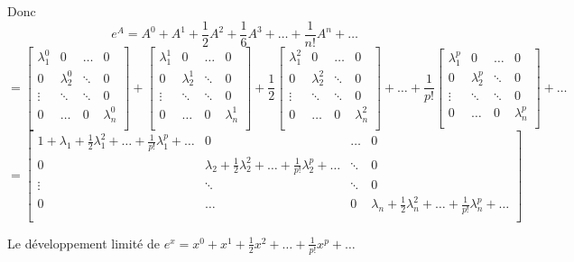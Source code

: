 \documentclass[]{book}
\theoremstyle{definition}
\begin{document}
Donc 
$$
e^A = A^0 + A^1 + \frac{1}{2}A^2 + \frac{1}{6}A^3 + \ldots + \frac{1}{n!}A^n + \ldots
$$
$$= 
\begin{bmatrix}
    \lambda_1^0 & 0 & \ldots & 0 \\    
    0 & \lambda_2^0  & \ddots & 0 \\
    \vdots & \ddots & \ddots & 0 \\    
    0 & \ldots & 0 & \lambda_n^0\\
\end{bmatrix}
+
\begin{bmatrix}
    \lambda_1^1 & 0 & \ldots & 0 \\    
    0 & \lambda_2^1  & \ddots & 0 \\
    \vdots & \ddots & \ddots & 0 \\    
    0 & \ldots & 0 & \lambda_n^1\\
\end{bmatrix}
+
\frac{1}{2}
\begin{bmatrix}
    \lambda_1^2 & 0 & \ldots & 0 \\    
    0 & \lambda_2^2  & \ddots & 0 \\
    \vdots & \ddots & \ddots & 0 \\    
    0 & \ldots & 0 & \lambda_n^2\\
\end{bmatrix}
+
\ldots
+
\frac{1}{p!}
\begin{bmatrix}
    \lambda_1^p & 0 & \ldots & 0 \\    
    0 & \lambda_2^p  & \ddots & 0 \\
    \vdots & \ddots & \ddots & 0 \\    
    0 & \ldots & 0 & \lambda_n^p\\
\end{bmatrix}
+\ldots    
$$
$$
= 
\begin{bmatrix}
    1 + \lambda_1 + \frac{1}{2}\lambda_1^2 + \ldots + \frac{1}{p!}\lambda_1^p + \ldots & 0 & \ldots & 0 \\    
    0 & \lambda_2 + \frac{1}{2}\lambda_2^2 + \ldots + \frac{1}{p!}\lambda_2^p + \ldots  & \ddots & 0 \\
    \vdots & \ddots & \ddots & 0 \\    
    0 & \ldots & 0 & \lambda_n + \frac{1}{2}\lambda_n^2 + \ldots + \frac{1}{p!}\lambda_n^p + \ldots\\
\end{bmatrix}
$$

Le d\'eveloppement limit\'e de $e^x = x^0 + x^1 + \frac{1}{2}x^2 + \ldots + \frac{1}{p!}x^p + \ldots$
\end{document}
